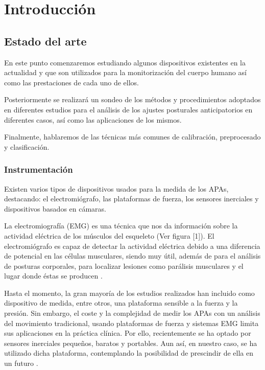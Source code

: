 
\chapter{Introducci\'on}
\label{ch:Introduccion}

\section{Estado del arte}

En este punto comenzaremos estudiando algunos dispositivos existentes en la actualidad y que son utilizados para la monitorización del cuerpo humano así como las prestaciones de cada uno de ellos.

Posteriormente se realizará un sondeo de los métodos y procedimientos adoptados en diferentes estudios para el análisis de los ajustes posturales anticipatorios en diferentes casos, así como las aplicaciones de los mismos.

Finalmente, hablaremos de las técnicas más comunes de calibración, preprocesado y clasificación.

\subsection{Instrumentaci\'on}

Existen varios tipos de dispositivos usados para la medida de los APAs, destacando: el electromiógrafo, las plataformas de fuerza, los sensores inerciales y dispositivos basados en cámaras.

La electromiografía (EMG) es una técnica que nos da información sobre la actividad eléctrica de los músculos del esqueleto (Ver figura [1]). El electromiógrafo es capaz de detectar la actividad eléctrica debido a una diferencia de potencial en las células musculares, siendo muy útil, además de para el análisis de posturas corporales,  para localizar lesiones como parálisis musculares y el lugar donde éstas se producen \cite{Marcio2010} \cite{Instr1}. 


Hasta el momento, la gran mayoría de los estudios realizados han incluido como dispositivo de medida, entre otros,  una plataforma sensible a la fuerza y la presión.  Sin embargo, el coste y la complejidad de medir los APAs con un análisis del movimiento tradicional, usando plataformas de fuerza y sistemas EMG limita sus aplicaciones en la práctica clínica. Por ello, recientemente se ha optado por sensores inerciales pequeños, baratos y portables. Aun así, en nuestro caso, se ha utilizado dicha plataforma, contemplando la posibilidad de prescindir de ella en un futuro \cite{Mancini2009} \cite{Vennila2011}.

